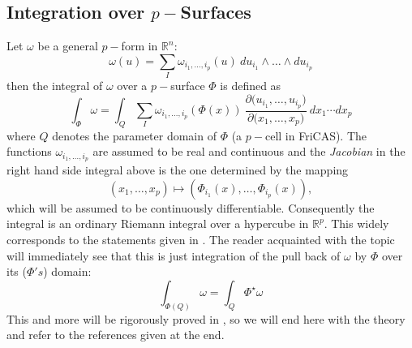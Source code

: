\documentclass[12pt,a4paper]{article}
\newcommand{\RR}[1]{\mathbb{R}^{#1}}
\begin{document}
\subsection{Integration over $p-$Surfaces}
Let $\omega$ be a general $p-$form in $\RR n$:
\begin{displaymath}
   \omega(u) = \sum_{I} \omega_{i_1,\ldots,i_p}(u)\ du_{i_1}
   \wedge\ldots\wedge du_{i_p}
\end{displaymath}
then the integral of $\omega$ over a $p-$surface $\Phi$ is defined as
\begin{displaymath}
 \int_{\Phi} \omega = \int_{Q} 
   \sum_{I} \omega_{i_1,\ldots,i_p}(\Phi(x))
   \ \frac{\partial{(u_{i_1},\ldots,u_{i_p}})}{\partial{(x_1,\ldots,x_p})}
   \ dx_{1} \cdots dx_{p} 
\end{displaymath}
where $Q$ denotes the parameter domain of $\Phi$ (a $p-$cell in FriCAS).
The functions $\omega_{i_1,\ldots,i_p}$ are assumed to be real and
continuous and the {\em Jacobian} in the right hand side integral above
is the one determined by the mapping
\begin{displaymath}
     (x_1,\ldots,x_p) \mapsto (\Phi_{i_1}(x),\ldots,\Phi_{i_p}(x)),
\end{displaymath} 
which will be assumed to be continuously differentiable. Consequently
the integral is an ordinary Riemann integral over a hypercube in $\RR p$.
This widely corresponds to the statements given in \cite{PMA}. The
reader acquainted with the topic will immediately see that this is just
integration of the pull back of $\omega$ by $\Phi$ over its ($\Phi's$) 
domain:
\begin{displaymath}
    \int_{\Phi(Q)} \omega = \int_{Q} \Phi^{\star}\omega
\end{displaymath}
This and more will be rigorously proved in \cite{PMA}, so we will end
here with the theory and refer to the references given at the end.
%
\end{document}
